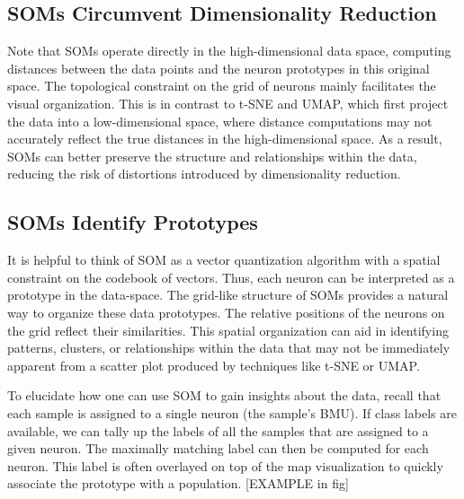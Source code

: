 \subsection*{SOMs Circumvent Dimensionality Reduction}

Note that SOMs operate directly in the high-dimensional data space, computing distances between the data points and the neuron prototypes in this original space. The topological constraint on the grid of neurons mainly facilitates the visual organization. This is in contrast to t-SNE and UMAP, which first project the data into a low-dimensional space, where distance computations may not accurately reflect the true distances in the high-dimensional space. As a result, SOMs can better preserve the structure and relationships within the data, reducing the risk of distortions introduced by dimensionality reduction.

\subsection*{SOMs Identify Prototypes}
It is helpful to think of SOM as a vector quantization algorithm with a spatial constraint on the codebook of vectors. Thus, each neuron can be interpreted as a prototype in the data-space. The grid-like structure of SOMs provides a natural way to organize these data prototypes. The relative positions of the neurons on the grid reflect their similarities. This spatial organization can aid in identifying patterns, clusters, or relationships within the data that may not be immediately apparent from a scatter plot produced by techniques like t-SNE or UMAP.

To elucidate how one can use SOM to gain insights about the data, recall that each sample is assigned to a single neuron (the sample's BMU). If class labels are available, we can tally up the labels of all the samples that are assigned to a given neuron. The maximally matching label can then be computed for each neuron. This label is often overlayed on top of the map visualization to quickly associate the prototype with a population.
[EXAMPLE in fig]




